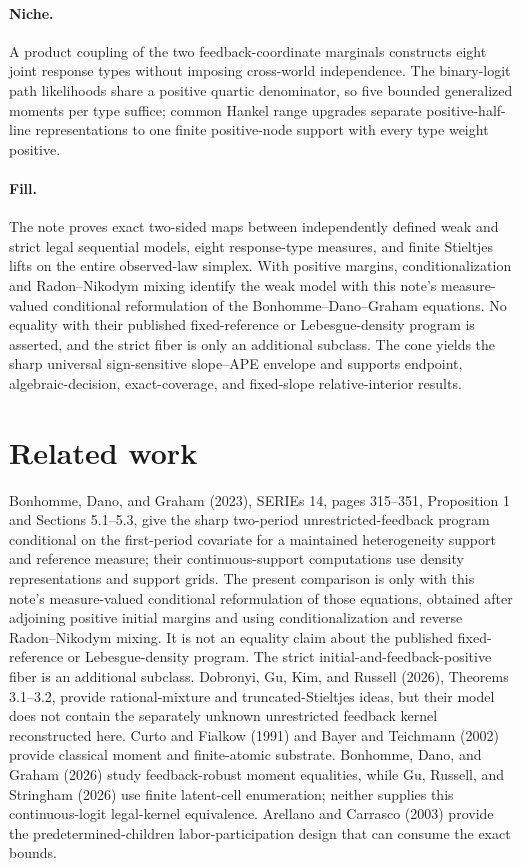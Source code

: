 \documentclass{article}
\begin{document}
\paragraph{Niche.} A product coupling of the two feedback-coordinate marginals constructs eight joint response types without imposing cross-world independence. The binary-logit path likelihoods share a positive quartic denominator, so five bounded generalized moments per type suffice; common Hankel range upgrades separate positive-half-line representations to one finite positive-node support with every type weight positive.

\paragraph{Fill.} The note proves exact two-sided maps between independently defined weak and strict legal sequential models, eight response-type measures, and finite Stieltjes lifts on the entire observed-law simplex. With positive margins, conditionalization and Radon--Nikodym mixing identify the weak model with this note's measure-valued conditional reformulation of the Bonhomme--Dano--Graham equations. No equality with their published fixed-reference or Lebesgue-density program is asserted, and the strict fiber is only an additional subclass. The cone yields the sharp universal sign-sensitive slope--APE envelope and supports endpoint, algebraic-decision, exact-coverage, and fixed-slope relative-interior results.

\section{Related work}

Bonhomme, Dano, and Graham (2023), SERIEs 14, pages 315--351, Proposition 1 and Sections 5.1--5.3, give the sharp two-period unrestricted-feedback program conditional on the first-period covariate for a maintained heterogeneity support and reference measure; their continuous-support computations use density representations and support grids. The present comparison is only with this note's measure-valued conditional reformulation of those equations, obtained after adjoining positive initial margins and using conditionalization and reverse Radon--Nikodym mixing. It is not an equality claim about the published fixed-reference or Lebesgue-density program. The strict initial-and-feedback-positive fiber is an additional subclass. Dobronyi, Gu, Kim, and Russell (2026), Theorems 3.1--3.2, provide rational-mixture and truncated-Stieltjes ideas, but their model does not contain the separately unknown unrestricted feedback kernel reconstructed here. Curto and Fialkow (1991) and Bayer and Teichmann (2002) provide classical moment and finite-atomic substrate. Bonhomme, Dano, and Graham (2026) study feedback-robust moment equalities, while Gu, Russell, and Stringham (2026) use finite latent-cell enumeration; neither supplies this continuous-logit legal-kernel equivalence. Arellano and Carrasco (2003) provide the predetermined-children labor-participation design that can consume the exact bounds.
\end{document}
